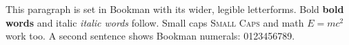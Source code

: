 \documentclass{article}
\begin{document}
This paragraph is set in Bookman with its wider, legible letterforms.
Bold \textbf{bold words} and italic \textit{italic words} follow.
Small caps \textsc{Small Caps} and math $E = mc^2$ work too.
A second sentence shows Bookman numerals: 0123456789.
\end{document}
